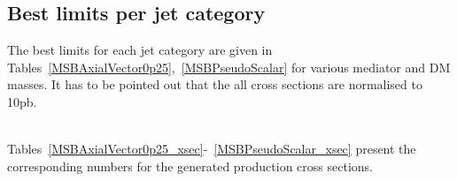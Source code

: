 \subsection{Best limits per jet category}

The best limits for each jet category are given in Tables~\ref{MSBAxialVector0p25},~\ref{MSBPseudoScalar} for various mediator and DM masses. It has to be pointed out that the all cross sections are normalised to 10pb.

\\



Tables~\ref{MSBAxialVector0p25_xsec}-~\ref{MSBPseudoScalar_xsec} present the corresponding numbers for the generated production cross sections.


\\

